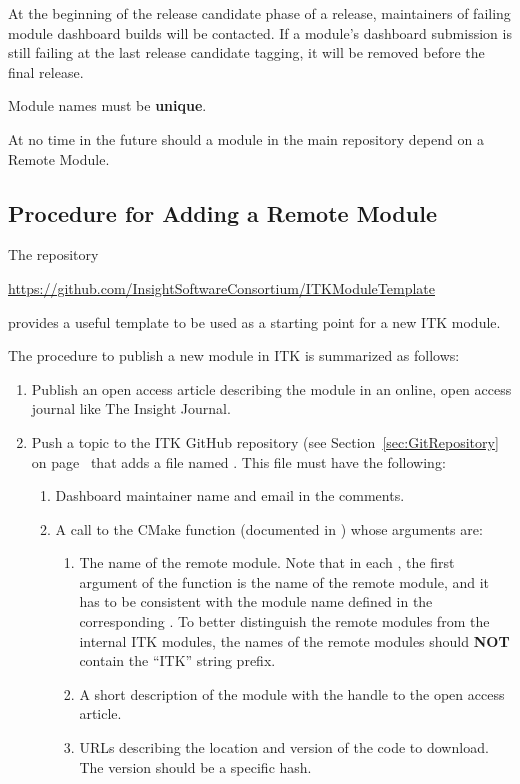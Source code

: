 At the beginning of the release candidate phase of a release, maintainers of
failing module dashboard builds will be contacted. If a module's dashboard
submission is still failing at the last release candidate tagging, it will be
removed before the final release.

Module names must be \textbf{unique}.

At no time in the future should a module in the main repository depend on a
Remote Module.

\subsection{Procedure for Adding a Remote Module}
\label{subsec:ProcedureAddingRemoteModules}

The repository
\begin{center}
  \url{https://github.com/InsightSoftwareConsortium/ITKModuleTemplate}
\end{center}

provides a useful template to be used as a starting point for a new ITK module.

The procedure to publish a new module in ITK is summarized as follows:
\begin{enumerate}
\item Publish an open access article describing the module in an online, open
  access journal like The Insight Journal.
\item Push a topic to the ITK GitHub repository (see
  Section~\ref{sec:GitRepository} on page~\pageref{sec:GitRepository} that
  adds a file named
  . This file must have the
  following:
  \begin{enumerate}
    \item Dashboard maintainer name and email in the comments.
    \item A call to the  CMake function (documented in
      ) whose arguments are:
      \begin{enumerate}
      \item The name of the remote module. Note that in each
        , the first argument of the function
         is the name of the remote module, and it has to be
        consistent with the module name defined in the corresponding
        . To better distinguish the remote
        modules from the internal ITK modules, the names of the remote modules should
        \textbf{NOT} contain the ``ITK'' string prefix.
      \item A short description of the module with the handle to the open access
        article.
      \item URLs describing the location and version of the code to download. The
        version should be a specific hash.
      \end{enumerate}
  \end{enumerate}
\end{enumerate}

